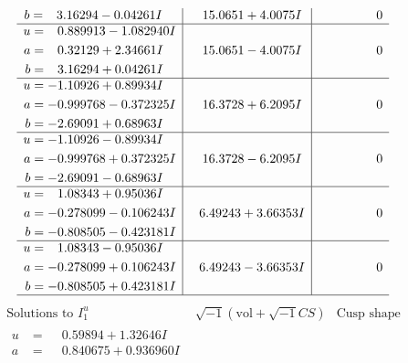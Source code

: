 \documentclass[1p]{elsarticle_modified}
\theoremstyle{definition}
\newcommand{\I}{\sqrt{-1}}
\begin{document}
$$\begin{array}{c|c|c}
\begin{aligned}
b &= \phantom{-}3.16294 - 0.04261 I\end{aligned}
 & \phantom{-}15.0651 + 4.0075 I & \phantom{-0.000000 } 0 \\ \hline\begin{aligned}
u &= \phantom{-}0.889913 - 1.082940 I \\
a &= \phantom{-}0.32129 + 2.34661 I \\
b &= \phantom{-}3.16294 + 0.04261 I\end{aligned}
 & \phantom{-}15.0651 - 4.0075 I & \phantom{-0.000000 } 0 \\ \hline\begin{aligned}
u &= -1.10926 + 0.89934 I \\
a &= -0.999768 - 0.372325 I \\
b &= -2.69091 + 0.68963 I\end{aligned}
 & \phantom{-}16.3728 + 6.2095 I & \phantom{-0.000000 } 0 \\ \hline\begin{aligned}
u &= -1.10926 - 0.89934 I \\
a &= -0.999768 + 0.372325 I \\
b &= -2.69091 - 0.68963 I\end{aligned}
 & \phantom{-}16.3728 - 6.2095 I & \phantom{-0.000000 } 0 \\ \hline\begin{aligned}
u &= \phantom{-}1.08343 + 0.95036 I \\
a &= -0.278099 - 0.106243 I \\
b &= -0.808505 - 0.423181 I\end{aligned}
 & \phantom{-}6.49243 + 3.66353 I & \phantom{-0.000000 } 0 \\ \hline\begin{aligned}
u &= \phantom{-}1.08343 - 0.95036 I \\
a &= -0.278099 + 0.106243 I \\
b &= -0.808505 + 0.423181 I\end{aligned}
 & \phantom{-}6.49243 - 3.66353 I & \phantom{-0.000000 } 0\\
 \hline 
 \end{array}$$\newpage$$\begin{array}{c|c|c}  
\text{Solutions to }I^u_{1}& \I (\text{vol} + \sqrt{-1}CS) & \text{Cusp shape}\\
 \hline 
\begin{aligned}
u &= \phantom{-}0.59894 + 1.32646 I \\
a &= \phantom{-}0.840675 + 0.936960 I \\

\end{aligned}
\end{array}$$
\end{document}
